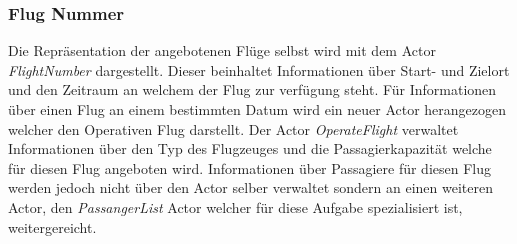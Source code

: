 \subsubsection{Flug Nummer}
Die Repräsentation der angebotenen Flüge selbst wird mit dem Actor \textit{FlightNumber} dargestellt. Dieser beinhaltet Informationen über Start- und Zielort und den Zeitraum an welchem der Flug zur verfügung steht. Für Informationen über einen Flug an einem bestimmten Datum wird ein neuer Actor herangezogen welcher den Operativen Flug darstellt. Der Actor \textit{OperateFlight} verwaltet Informationen über den Typ des Flugzeuges und die Passagierkapazität welche für diesen Flug angeboten wird. Informationen über Passagiere für diesen Flug werden jedoch nicht über den Actor selber verwaltet sondern an einen weiteren Actor, den \textit{PassangerList} Actor welcher für diese Aufgabe spezialisiert ist, weitergereicht. \\

